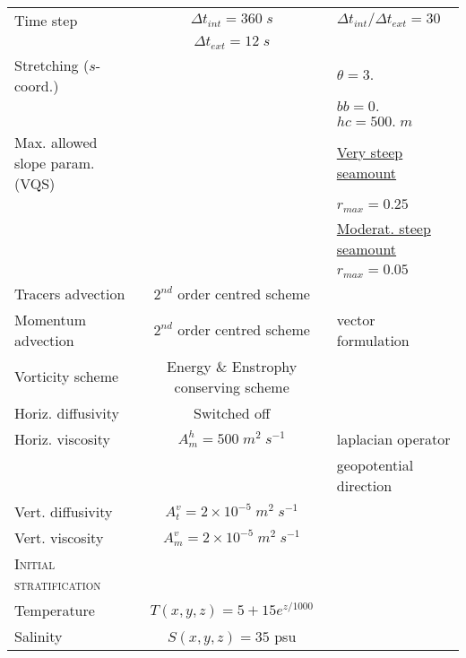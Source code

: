\documentclass[authoryear]{elsarticle}
\begin{document}
\begin{table}[htp]
\begin{scriptsize}
\begin{tabular}{lcl}
			Time step      & $\Delta t_{int} = 360 \;s$            & $\Delta t_{int} / \Delta t_{ext} = 30$ \\
			               & $\Delta t_{ext} = 12 \;s$             & \\
			Stretching ($s$-coord.) & \cite{Song1994}            & $\theta = 3.$ \\
			                        &                            & $bb = 0.$  \\
			                        &                            & $hc = 500. \; m$  \\
			Max. allowed slope param. (VQS) &                      & \underline{Very steep seamount} \\
			                                &                        & $r_{max} = 0.25$ \\
			                                &                        & \underline{Moderat. steep seamount} \\
			                                &                        & $r_{max} = 0.05$ \\
            Tracers advection  & $2^{nd}$ order centred scheme & \\
            Momentum advection & $2^{nd}$ order centred scheme & vector formulation \\
            Vorticity scheme   & Energy \& Enstrophy conserving scheme & \\
            Horiz. diffusivity & Switched off & \\
			Horiz. viscosity   & $A^h_m = 500 \; m^2 \;s^{-1}$ & laplacian operator \\
			                   &                               & geopotential direction \\
			Vert. diffusivity  & $A^v_t = 2 \times 10^{-5} \; m^2 \;s^{-1}$ & \\
			Vert. viscosity    & $A^v_m = 2 \times 10^{-5} \; m^2 \;s^{-1}$ & \\                                            
			\cmidrule[0.5pt]{1-3}           
			\cellcolor{gray!25}\textsc{Initial stratification} & & \\
			Temperature & $T(x,y,z) = 5 + 15e^{z/1000}$ & \\
			Salinity    & $S(x,y,z) = 35$ psu           & \\                         
			\cmidrule[.5pt]{1-3}
		\end{tabular} 
	\end{scriptsize}
	\hspace{-7cm}
	\caption{ }
\end{table}
\end{document}
